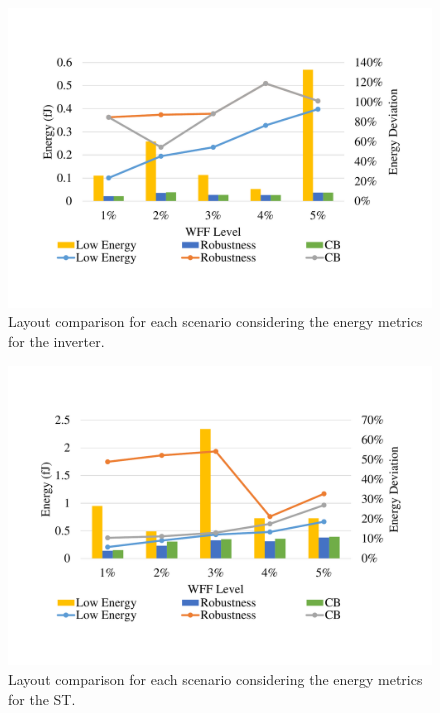 \documentclass[pgmicro,mestrado,english]{iiufrgs}
\begin{document}
    
    
    
    \begin{figure}[]
        \centering
            \includegraphics[width=1\textwidth, trim={1.25cm 2cm 2cm 3cm}, clip]{comp3Linv2Energy.pdf}
            \caption{Layout comparison for each scenario considering the energy metrics for the inverter.}
        \label{figscCompINV}
    \end{figure}  
    
    \begin{figure}[]
        \centering
            \includegraphics[width=1\textwidth, trim={1.25cm 3cm 2cm 3cm}, clip]{comp3Lst2Energy.pdf}
            \caption{Layout comparison for each scenario considering the energy metrics for the ST.}
        \label{figscCompST}
    \end{figure}
    
\end{document}

